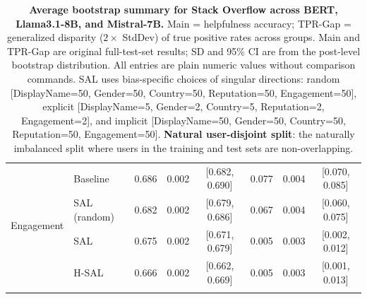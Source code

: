 \begin{table}[th!]
{\begin{tabular}{ll c c c c c c}
\multirow{4}{*}{Engagement} & Baseline & 0.686 & 0.002 & [0.682, 0.690] & 0.077 & 0.004 & [0.070, 0.085] \\
\addlinespace[4pt]
& SAL (random) & 0.682 & 0.002 & [0.679, 0.686] & 0.067 & 0.004 & [0.060, 0.075] \\
\addlinespace[4pt]
& SAL & 0.675 & 0.002 & [0.671, 0.679] & 0.005 & 0.003 & [0.002, 0.012] \\
\addlinespace[4pt]
& H-SAL & 0.666 & 0.002 & [0.662, 0.669] & 0.005 & 0.003 & [0.001, 0.013] \\
\addlinespace[4pt]
\bottomrule
\end{tabular}
}
\caption{\textbf{Average bootstrap summary for Stack Overflow across BERT, Llama3.1-8B, and Mistral-7B.}
Main = helpfulness accuracy; TPR-Gap = generalized disparity ($2 \times$ StdDev) of true positive rates across groups.
Main and TPR-Gap are original full-test-set results; SD and 95\% CI are from the post-level bootstrap distribution.
All entries are plain numeric values without comparison commands.
SAL uses bias-specific choices of singular directions: random [DisplayName=50, Gender=50, Country=50, Reputation=50, Engagement=50], explicit [DisplayName=5, Gender=2, Country=5, Reputation=2, Engagement=2], and implicit [DisplayName=50, Gender=50, Country=50, Reputation=50, Engagement=50].
\textbf{Natural user-disjoint split}: the naturally imbalanced split where users in the training and test sets are non-overlapping.}
\label{tab:ste-bootstrap-summary-plain-stackoverflow-natural-disjoint}
\end{table}
